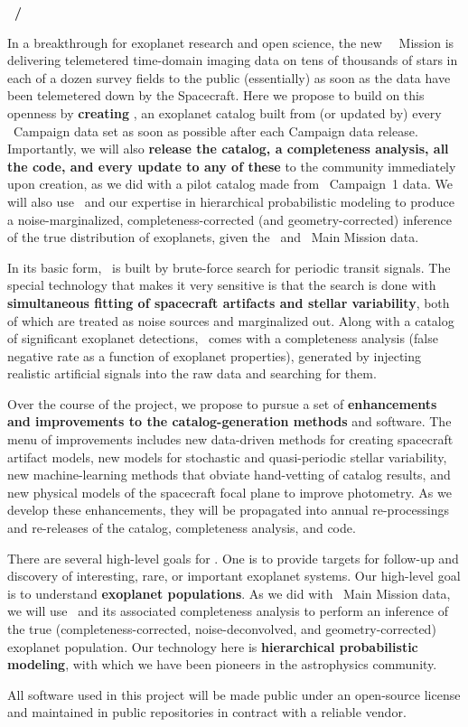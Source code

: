 \documentclass[12pt]{article}
\begin{document}
\noindent\textbf{\shortauthor~/~\fulltitle}
\bigskip

In a breakthrough for exoplanet research and open science, the new
\kepler\ \ketu\ Mission is delivering telemetered time-domain imaging
data on tens of thousands of stars in each of a dozen survey fields to
the public (essentially) as soon as the data have been telemetered
down by the Spacecraft.
Here we propose to build on this openness by \textbf{creating
  \thecatalog}, an exoplanet catalog built from (or updated by)
every \ketu\ Campaign data set as soon as possible after each Campaign
data release.
Importantly, we will also \textbf{release the catalog, a completeness
  analysis, all the code, and every update to any of these} to the
community immediately upon creation, as we did with a pilot catalog
made from \ketu\ Campaign~1 data.
We will also use \thecatalog\ and our expertise in hierarchical
probabilistic modeling to produce a noise-marginalized,
completeness-corrected (and geometry-corrected) inference of the true
distribution of exoplanets, given the \ketu\ and \kepler\ Main Mission
data.

In its basic form, \thecatalog\ is built by brute-force search for
periodic transit signals.
The special technology that makes it very sensitive is that the search
is done with \textbf{simultaneous fitting of spacecraft artifacts and stellar
variability}, both of which are treated as noise sources and
marginalized out.
Along with a catalog of significant exoplanet detections,
\thecatalog\ comes with a completeness analysis (false negative rate
as a function of exoplanet properties), generated by injecting
realistic artificial signals into the raw data and searching for them.

Over the course of the project, we propose to pursue a set of
\textbf{enhancements and improvements to the catalog-generation methods} and
software.
The menu of improvements includes new data-driven methods for creating
spacecraft artifact models, new models for stochastic and quasi-periodic
stellar variability, new machine-learning methods that obviate
hand-vetting of catalog results, and new physical models of the spacecraft
focal plane to improve photometry.
As we develop these enhancements, they will be propagated into annual
re-processings and re-releases of the catalog, completeness analysis,
and code.

There are several high-level goals for \thecatalog.
One is to provide targets for follow-up and discovery of interesting,
rare, or important exoplanet systems.
Our high-level goal is to understand \textbf{exoplanet populations}.
As we did with \kepler\ Main Mission data, we will use
\thecatalog\ and its associated completeness analysis to perform an
inference of the true (completeness-corrected, noise-deconvolved, and
geometry-corrected) exoplanet population.
Our technology here is \textbf{hierarchical probabilistic modeling},
with which we have been pioneers in the astrophysics community.

All software used in this project will be made public under an
open-source license and maintained in public  repositories in
contract with a reliable vendor.
\end{document}
